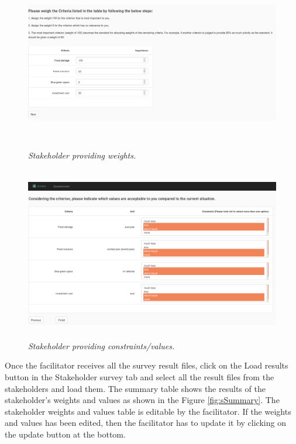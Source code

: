 \documentclass[a4paper]{article}
\begin{document}
\begin{figure}[H]
\begin{center}
\includegraphics[width=6in, height=3in]{img/weights.png}
\caption{\small \sl Stakeholder providing weights.\label{fig:weights}}
\end{center}
\end{figure}

\begin{figure}[H]
\begin{center}
\includegraphics[width=6in, height=3in]{img/values.png}
\caption{\small \sl Stakeholder providing constraints/values.\label{fig:values}}
\end{center}
\end{figure}

Once the facilitator receives all the survey result files, click on the Load results button in the Stakeholder survey tab and select all the result files from the stakeholders and load them. The summary table shows the results of the stakeholder's weights and values as shown in the Figure \ref{fig:sSummary}. The stakeholder weights and values table is editable by the facilitator. If the weights and values has been edited, then the facilitator has to update it by clicking on the update button at the bottom.
\end{document}
